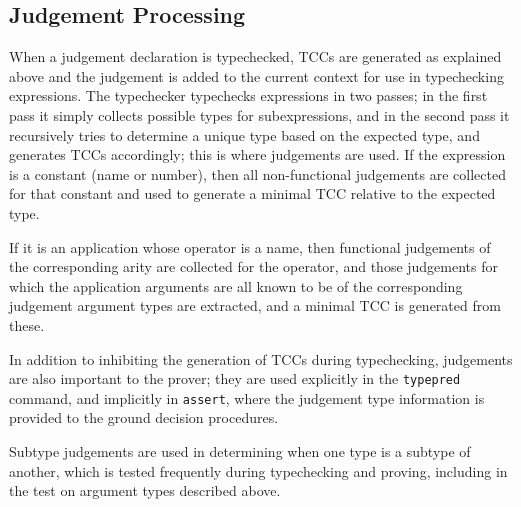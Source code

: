 \subsection{Judgement Processing}

When a judgement declaration is typechecked, TCCs are generated as
explained above and the judgement is added to the current context for use
in typechecking expressions.  The typechecker typechecks expressions in
two passes; in the first pass it simply collects possible types for
subexpressions, and in the second pass it recursively tries to determine a
unique type based on the expected type, and generates TCCs accordingly;
this is where judgements are used.  If the expression is a constant (name
or number), then all non-functional judgements are collected for that
constant and used to generate a minimal TCC relative to the expected type.

If it is an application whose operator is a name, then functional
judgements of the corresponding arity are collected for the operator, and
those judgements for which the application arguments are all known to be
of the corresponding judgement argument types are extracted, and a minimal
TCC is generated from these.

In addition to inhibiting the generation of TCCs during typechecking,
judgements are also important to the prover; they are used explicitly in
the \texttt{typepred} command, and implicitly in \texttt{assert}, where
the judgement type information is provided to the ground decision
procedures.

Subtype judgements are used in determining when one type is a subtype of
another, which is tested frequently during typechecking and proving,
including in the test on argument types described above.

